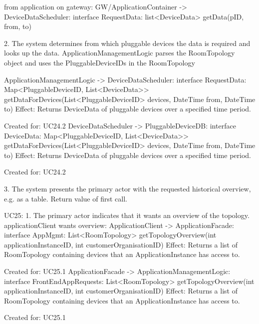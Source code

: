                 from application on gateway:
                    GW/ApplicationContainer -> DeviceDataScheduler: interface RequestData: list<DeviceData> getData(pID, from, to)

            2. The system determines from which pluggable devices the data is required and looks up the data.
                ApplicationManagementLogic parses the RoomTopology object and uses the PluggableDeviceIDs in the RoomTopology

                    ApplicationManagementLogic -> DeviceDataScheduler: interface RequestData: Map<PluggableDeviceID, List<DeviceData>> getDataForDevices(List<PluggableDeviceID> devices, DateTime from, DateTime to)
                        Effect: Returns DeviceData of pluggable devices over a specified time period.
                        \item Created for: UC24.2
                    DeviceDataScheduler -> PluggableDeviceDB: interface DeviceData: Map<PluggableDeviceID, List<DeviceData>> getDataForDevices(List<PluggableDeviceID> devices, DateTime from, DateTime to)
                        Effect: Returns DeviceData of pluggable devices over a specified time period.
                        \item Created for: UC24.2

            3. The system presents the primary actor with the requested historical overview, e.g. as a table.
                Return value of first call.


        UC25:
            1. The primary actor indicates that it wants an overview of the topology.
                applicationClient wants overview:
                    ApplicationClient -> ApplicationFacade: interface AppMgmt: List<RoomTopology> getTopologyOverview(int applicationInstanceID, int customerOrganisationID)
                        Effect: Returns a list of RoomTopology containing devices that an ApplicationInstance has access to.
                        \item Created for: UC25.1
                    ApplicationFacade -> ApplicationManagementLogic: interface FrontEndAppRequests: List<RoomTopology> getTopologyOverview(int applicationInstanceID, int customerOrganisationID)
                        Effect: Returns a list of RoomTopology containing devices that an ApplicationInstance has access to.
                        \item Created for: UC25.1

